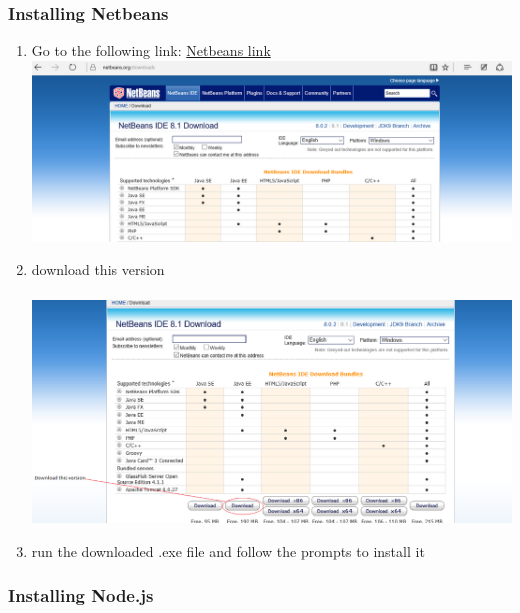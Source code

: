 \documentclass[a4paper,12pt]{article}
\begin{document}
\subsubsection{Installing Netbeans}
\begin{enumerate}
\item Go to the following link: \href{https://netbeans.org/downloads}{Netbeans link}\\[0.2cm]
\includegraphics[width=0.9\linewidth, center]{./Installation/mavenlink.PNG}\\[0.4cm] 
 
\item download this version\\\\
\includegraphics[width=0.9\linewidth, center]{./Installation/maven.PNG}\\[0.4cm] 
 
\item run the downloaded .exe file and follow the prompts to install it\\
\end{enumerate}
\subsubsection{Installing Node.js}
\end{document}
